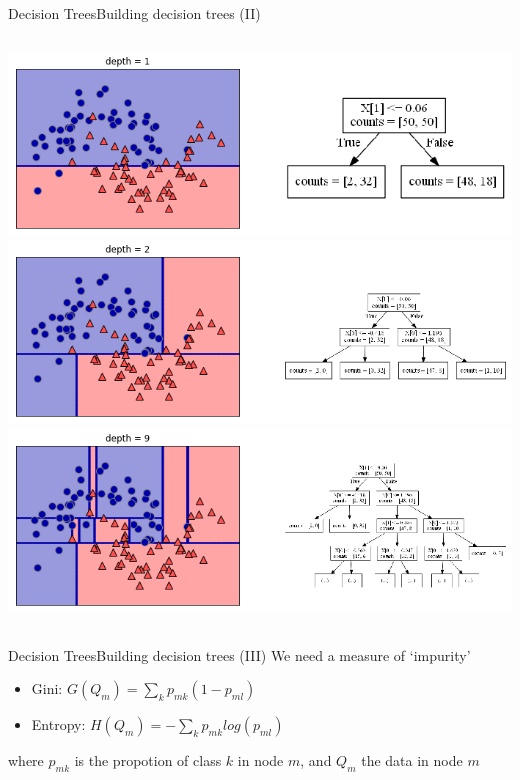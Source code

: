\documentclass[10pt,compress]{beamer} %
\begin{document}
\begin{frame}[plain]{Decision Trees}{Building decision trees (II)}
    \begin{columns}
            \centering \includegraphics[width=\linewidth]{figs/tree-d1.png}
            \centering \includegraphics[width=\linewidth]{figs/tree-d2.png}
            \centering \includegraphics[width=\linewidth]{figs/tree-d9.png}
    \end{columns}
\end{frame}

\begin{frame}[plain]{Decision Trees}{Building decision trees (III)}
    We need a measure of `impurity'
    \begin{itemize}
        \item Gini: $G(Q_m) = \sum_k p_{mk} (1 - p_{ml})$
        \item Entropy: $H(Q_m) = - \sum_k p_{mk} log(p_{ml})$
    \end{itemize}
    where $p_{mk}$ is the propotion of class $k$ in node $m$, and $Q_m$ the data in node $m$
\end{frame}
\end{document}
